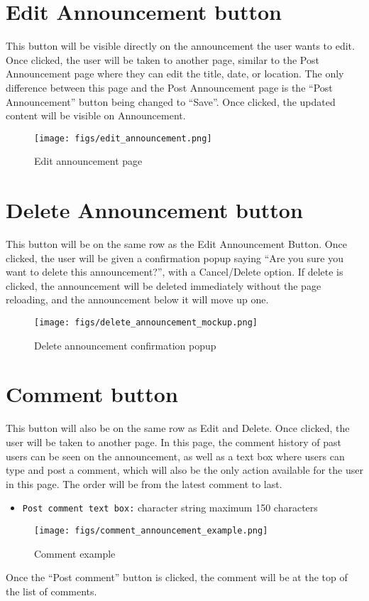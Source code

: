 \documentclass[conference]{IEEEtran}
\begin{document}
\section*{Edit Announcement button}
This button will be visible directly on the announcement the user wants to edit. Once clicked, the user will be taken to another page, similar to the Post Announcement page where they can edit the title, date, or location. The only difference between this page and the Post Announcement page is the “Post Announcement” button being changed to “Save”. Once clicked, the updated content will be visible on Announcement.
\begin{figure}[H]
\centering
\texttt{[image: figs/edit\_announcement.png]}
\caption{Edit announcement page}
\label{fig:Edit announcement page}
\end{figure}
\section*{Delete Announcement button}
This button will be on the same row as the Edit Announcement Button. Once clicked, the user will be given a confirmation popup saying “Are you sure you want to delete this announcement?”, with a Cancel/Delete option. If delete is clicked,  the announcement will be deleted immediately without the page reloading, and the announcement below it will move up one.
\begin{figure}[H]
\centering
\texttt{[image: figs/delete\_announcement\_mockup.png]}
\caption{Delete announcement confirmation popup}
\label{fig:Delete announcement confirmation popup}
\end{figure}
\section*{Comment button}
This button will also be on the same row as Edit and Delete. Once clicked, the user will be taken to another page. In this page, the comment history of past users can be seen on the announcement, as well as a text box where users can type and post a comment, which will also be the only action available for the user in this page.  The order will be from the latest comment to last.
\begin{itemize}
    \item \texttt{Post comment text box:} character string maximum 150 characters
\end{itemize}
\begin{figure}[H]
\centering
\texttt{[image: figs/comment\_announcement\_example.png]}
\caption{Comment example}
\label{fig:Comment example}
\end{figure}
Once the “Post comment” button is clicked, the comment will be at the top of the list of comments.
\end{document}
